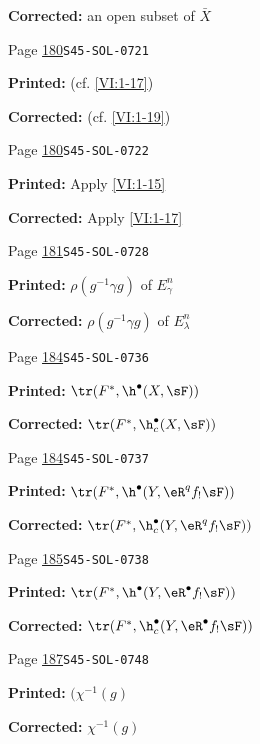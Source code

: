 \begin{description}
\par\noindent\textbf{Corrected:} an open subset of $\bar X$
\smallskip
\item[\hypertarget{apparatus:EN-0106}{106}] Page \hyperlink{printpage:en:180}{180}\quad\texttt{S45-SOL-0721}
\par\noindent\textbf{Printed:} (cf. \ref{VI:1-17})
\par\noindent\textbf{Corrected:} (cf. \ref{VI:1-19})
\smallskip
\item[\hypertarget{apparatus:EN-0107}{107}] Page \hyperlink{printpage:en:180}{180}\quad\texttt{S45-SOL-0722}
\par\noindent\textbf{Printed:} Apply \ref{VI:1-15}
\par\noindent\textbf{Corrected:} Apply \ref{VI:1-17}
\smallskip
\item[\hypertarget{apparatus:EN-0108}{108}] Page \hyperlink{printpage:en:181}{181}\quad\texttt{S45-SOL-0728}
\par\noindent\textbf{Printed:} $\rho(g^{-1} \gamma g)$ of $E_\gamma^n$
\par\noindent\textbf{Corrected:} $\rho(g^{-1} \gamma g)$ of $E_\lambda^n$
\smallskip
\item[\hypertarget{apparatus:EN-0109}{109}] Page \hyperlink{printpage:en:184}{184}\quad\texttt{S45-SOL-0736}
\par\noindent\textbf{Printed:} \(\tr(F^\ast,\h^\bullet(X,\sF))\)
\par\noindent\textbf{Corrected:} \(\tr(F^\ast,\h_c^\bullet(X,\sF))\)
\smallskip
\item[\hypertarget{apparatus:EN-0110}{110}] Page \hyperlink{printpage:en:184}{184}\quad\texttt{S45-SOL-0737}
\par\noindent\textbf{Printed:} \(\tr(F^\ast, \h^\bullet(Y,\eR^q f_! \sF))\)
\par\noindent\textbf{Corrected:} \(\tr(F^\ast,\h_c^\bullet(Y,\eR^q f_! \sF))\)
\smallskip
\item[\hypertarget{apparatus:EN-0111}{111}] Page \hyperlink{printpage:en:185}{185}\quad\texttt{S45-SOL-0738}
\par\noindent\textbf{Printed:} \(\tr(F^\ast,\h^\bullet(Y,\eR^\bullet f_! \sF))\)
\par\noindent\textbf{Corrected:} \(\tr(F^\ast,\h_c^\bullet(Y,\eR^\bullet f_! \sF))\)
\smallskip
\item[\hypertarget{apparatus:EN-0112}{112}] Page \hyperlink{printpage:en:187}{187}\quad\texttt{S45-SOL-0748}
\par\noindent\textbf{Printed:} \((\chi^{-1}(g)\)
\par\noindent\textbf{Corrected:} \(\chi^{-1}(g)\)

\end{description}
